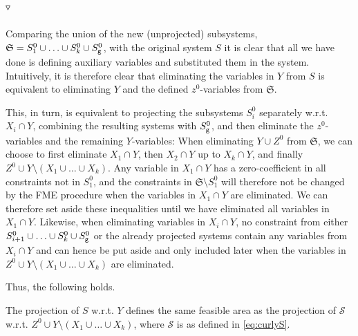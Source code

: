 {$\triangledown$}
\\\\
\normalsize{Comparing the union of the new (unprojected) subsystems, $\mathfrak{S} = S_1^0\cup\ldots\cup S_k^0\cup S_{\texttt{g}}^0$, with the original system $S$ it is clear that
all we have done is defining auxiliary variables and substituted them in the system. Intuitively, it is therefore clear that eliminating the variables in $Y$ from $S$ is equivalent to eliminating $Y$ and the defined $z^0$-variables from $\mathfrak{S}$.}

This, in turn, is equivalent to projecting the subsystems $S^0_i$ separately w.r.t. $X_i\cap Y$, combining the resulting systems with $S^0_{\texttt{g}}$, and then eliminate the $z^0$-variables and the remaining $Y$-variables: %
%
When eliminating $Y\cup Z^0$ from $\mathfrak{S}$, we can choose to first eliminate $X_1\cap Y$, then $X_2\cap Y$ up to $X_k\cap Y$, and finally $Z^0\cup Y\setminus(X_1\cup \ldots\cup X_k)$. 
Any variable in $X_1\cap Y$ has a zero-coefficient in all constraints not in $S^0_1$, and the constraints in $\mathfrak{S}\setminus S^0_1$ will therefore not be changed by the FME procedure when the variables in $X_1\cap Y$ are eliminated.  We can therefore set aside these inequalities until we have eliminated all variables in $X_1\cap Y$. Likewise, when eliminating variables in $X_i\cap Y$, no constraint from either $S_{i+1}^0\cup \ldots \cup S_k^0\cup S_{\texttt{g}}^0$ or the already projected systems contain any variables from $X_i\cap Y$ and can hence be put aside and only included later when the variables in $Z^0\cup Y\setminus(X_1\cup \ldots\cup X_k)$ are eliminated.

Thus, the following holds. 
\begin{prop}
{The projection of $S$ w.r.t. $Y$ defines the same feasible area as 
the projection of $\mathcal{S}$ w.r.t. $Z^0 \cup Y\setminus (X_1\cup \ldots \cup X_k)$, where
$\mathcal{S}$ is as defined in \ref{eq:curlyS}.%
}
\end{prop}

